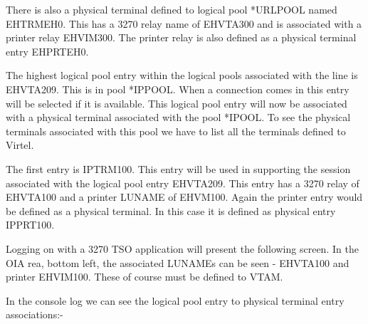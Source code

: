 \documentclass[letterpaper,10pt,english]{sphinxmanual}
\begin{document}

There is also a physical terminal defined to logical pool *URLPOOL named EHTRMEH0. This has a 3270 relay name of EHVTA300 and is associated with a printer relay EHVIM300. The printer relay is also defined as a physical terminal entry EHPRTEH0.

The highest logical pool entry within the logical pools associated with the line is EHVTA209. This is in pool *IPPOOL. When a connection comes in this entry will be selected if it is available. This logical pool entry will now be associated with a physical terminal associated with the pool *IPOOL. To see the physical terminals associated with this pool we have to list all the terminals defined to Virtel.


The first entry is IPTRM100. This entry will be used in supporting the session associated with the logical pool entry EHVTA209. This entry has a 3270 relay of EHVTA100 and a printer LUNAME of EHVM100. Again the printer entry would be defined as a physical terminal. In this case it is defined as physical entry IPPRT100.


Logging on with a 3270 TSO application will present the following screen. In the OIA rea, bottom left, the associated LUNAMEs can be seen - EHVTA100 and printer EHVIM100. These of course must be defined to VTAM.


In the console log we can see the logical pool entry to physical terminal entry associations:-
\end{document}
